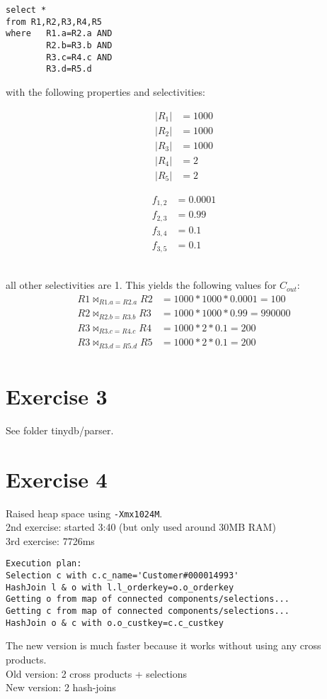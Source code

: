 \documentclass[11pt,a4paper]{scrartcl}
\begin{document}
\begin{verbatim}
select *
from R1,R2,R3,R4,R5
where 	R1.a=R2.a AND
		R2.b=R3.b AND
		R3.c=R4.c AND
		R3.d=R5.d
\end{verbatim}
with the following properties and selectivities:\\
\begin{minipage}{.2\textwidth}
\begin{align*}
|R_1|&=1000\\
|R_2|&=1000\\
|R_3|&=1000\\
|R_4|&=2\\
|R_5|&=2
\end{align*}
\end{minipage}
\begin{minipage}{.2\textwidth}
\begin{align*}
f_{1,2}&=0.0001\\
f_{2,3}&=0.99\\
f_{3,4}&=0.1\\
f_{3,5}&=0.1
\end{align*}
\end{minipage}\\
all other selectivities are 1.
This yields the following values for $C_{out}$:
\begin{align*}
R1 \bowtie_{R1.a=R2.a} R2 &= 1000*1000*0.0001 = 100\\
R2 \bowtie_{R2.b=R3.b} R3 &= 1000*1000*0.99 = 990000\\
R3 \bowtie_{R3.c=R4.c} R4 &= 1000*2*0.1 = 200\\
R3 \bowtie_{R3.d=R5.d} R5 &= 1000*2*0.1 = 200\\
\end{align*}


\section*{Exercise 3}
See folder tinydb/parser.


\section*{Exercise 4}
Raised heap space using \verb|-Xmx1024M|.\\
2nd exercise: started 3:40 (but only used around 30MB RAM)\\
3rd exercise: 7726ms
\begin{verbatim}
Execution plan:
Selection c with c.c_name='Customer#000014993'
HashJoin l & o with l.l_orderkey=o.o_orderkey
Getting o from map of connected components/selections...
Getting c from map of connected components/selections...
HashJoin o & c with o.o_custkey=c.c_custkey
\end{verbatim}
The new version is much faster because it works without using any cross products.\\
Old version: 2 cross products + selections\\
New version: 2 hash-joins
\end{document}
